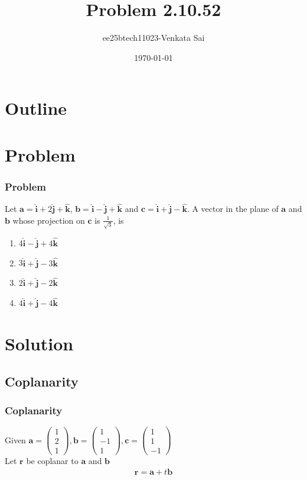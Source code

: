 \documentclass{beamer}
\title{Problem 2.10.52}
\author{ee25btech11023-Venkata Sai}
\date{\today}
\theoremstyle{remark}
\newcommand{\myvec}[1]{\ensuremath{\begin{pmatrix}#1\end{pmatrix}}}
\let\vec\mathbf
\numberwithin{equation}{section}
\begin{document}
\begin{frame}
\titlepage
\end{frame}

\section*{Outline}
\begin{frame}
\tableofcontents
\end{frame}

\section{Problem}

\begin{frame}
\frametitle{Problem}
Let $\vec{a} = \hat{\vec{i}} + 2\hat{\vec{j}} + \hat{\vec{k}}$, $\vec{b} = \hat{\vec{i}} - \hat{\vec{j}} + \hat{\vec{k}}$ and $\vec{c} = \hat{\vec{i}} + \hat{\vec{j}} - \hat{\vec{k}}$. A vector in the plane of $\vec{a}$ and $\vec{b}$ whose projection on $\vec{c}$ is $\frac{1}{\sqrt{3}}$, is 
\begin{enumerate}
\item 4$\hat{\vec{i}} - \hat{\vec{j}} + 4\hat{\vec{k}}$
\item 3$\hat{\vec{i}} + \hat{\vec{j}} - 3\hat{\vec{k}}$
\item $2\hat{\vec{i}} + \hat{\vec{j}} - 2\hat{\vec{k}}$
\item $4\hat{\vec{i}} + \hat{\vec{j}} - 4\hat{\vec{k}}$
\end{enumerate}
\end{frame}
\section{Solution}
 
\subsection{Coplanarity}
\begin{frame}
\setcounter{section}{1}
\frametitle{Coplanarity}
Given $\vec{a}=\myvec{1\\2\\1},\vec{b}=\myvec{1\\-1\\1},\vec{c}=\myvec{1\\1\\-1}$ \\

Let $\vec{r}$ be coplanar to $\vec{a}$ and $\vec{b}$
\begin{align}
 \vec{r}=\vec{a}+t\vec{b} 
 \end{align}
\end{frame}
\end{document}
